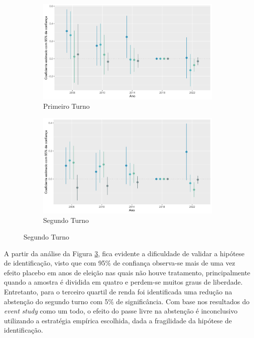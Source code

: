 \begin{figure}[!ht]
  \caption{Análise de efeito heterogêneo através de um \textit{event study}}
    \begin{subfigure}[t]{0.49\linewidth}
      \includegraphics[width = \linewidth]{relatorios/passe-livre/graficos/event_study_heter_1t.png}
      \caption{Primeiro Turno}
      \label{fig_eventStud1}
    \end{subfigure}
    \hfill
    \begin{subfigure}[t]{0.49\linewidth}
      \includegraphics[width = \linewidth]{relatorios/passe-livre/graficos/event_study_heter_2t.png}
      \caption{Segundo Turno}
      \label{fig_eventStud2}
    \end{subfigure}
    

    \label{fig_eventStud}
  \end{figure}

A partir da análise da Figura \ref{fig_eventStud}, fica evidente a dificuldade de validar a hipótese de identificação, visto que com 95\% de confiança observa-se mais de uma vez efeito placebo em anos de eleição nas quais não houve tratamento, principalmente quando a amostra é dividida em quatro e perdem-se muitos graus de liberdade. Entretanto, para o terceiro quartil de renda foi identificada uma redução na abstenção do segundo turno com 5\% de significância. Com base nos resultados do \textit{event study} como um todo, o efeito do passe livre na abstenção é inconclusivo utilizando a estratégia empírica escolhida, dada a fragilidade da hipótese de identificação.

